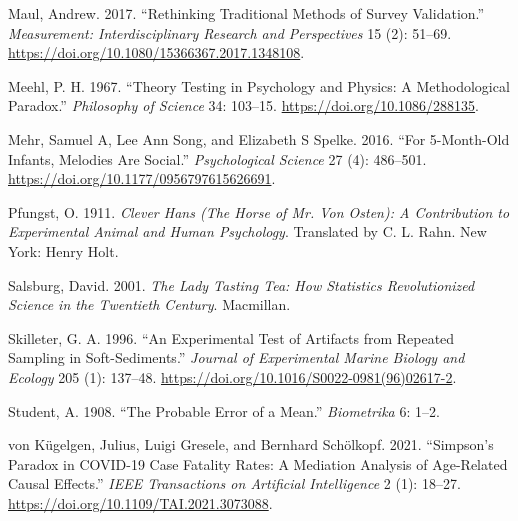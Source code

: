 \documentclass[
  letterpaper,
  DIV=11,
  numbers=noendperiod]{scrreprt}
\newlength{\cslhangindent}
\newenvironment{CSLReferences}[2] %
 {\begin{list}{}{%
  \setlength{\itemindent}{0pt}
  \setlength{\leftmargin}{0pt}
  \setlength{\parsep}{0pt}
  \ifodd #1
   \setlength{\leftmargin}{\cslhangindent}
   \setlength{\itemindent}{-1\cslhangindent}
  \fi
  \setlength{\itemsep}{#2\baselineskip}}}
 {\end{list}}
\begin{document}
\begin{CSLReferences}{1}{0}
Maul, Andrew. 2017. {``Rethinking {Traditional Methods} of {Survey
Validation}.''} \emph{Measurement: Interdisciplinary Research and
Perspectives} 15 (2): 51--69.
\url{https://doi.org/10.1080/15366367.2017.1348108}.

Meehl, P. H. 1967. {``Theory Testing in Psychology and Physics: {A}
Methodological Paradox.''} \emph{Philosophy of Science} 34: 103--15.
\url{https://doi.org/10.1086/288135}.

Mehr, Samuel A, Lee Ann Song, and Elizabeth S Spelke. 2016. {``For
5-Month-Old Infants, Melodies Are Social.''} \emph{Psychological
Science} 27 (4): 486--501.
\url{https://doi.org/10.1177/0956797615626691}.

Pfungst, O. 1911. \emph{Clever {Hans} ({The} Horse of {Mr}. Von
{Osten}): {A} Contribution to Experimental Animal and Human Psychology}.
Translated by C. L. Rahn. {New York}: {Henry Holt}.

Salsburg, David. 2001. \emph{The Lady Tasting Tea: {How} Statistics
Revolutionized Science in the Twentieth Century}. {Macmillan}.

Skilleter, G. A. 1996. {``An Experimental Test of Artifacts from
Repeated Sampling in Soft-Sediments.''} \emph{Journal of Experimental
Marine Biology and Ecology} 205 (1): 137--48.
\url{https://doi.org/10.1016/S0022-0981(96)02617-2}.

Student, A. 1908. {``The Probable Error of a Mean.''} \emph{Biometrika}
6: 1--2.

von Kügelgen, Julius, Luigi Gresele, and Bernhard Schölkopf. 2021.
{``Simpson's Paradox in COVID-19 Case Fatality Rates: A Mediation
Analysis of Age-Related Causal Effects.''} \emph{IEEE Transactions on
Artificial Intelligence} 2 (1): 18--27.
\url{https://doi.org/10.1109/TAI.2021.3073088}.

\end{CSLReferences}
\end{document}
